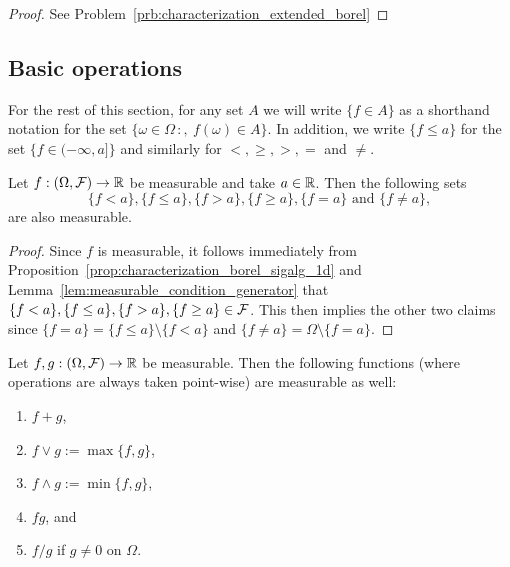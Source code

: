 \begin{proof}
See Problem~\ref{prb:characterization_extended_borel}
\end{proof}

\subsection{Basic operations}

For the rest of this section, for any set $A$ we will write $\{f \in A\}$ as a shorthand notation for the set $\{\omega \in \Omega \, :,\ f(\omega) \in A\}$. In addition, we write $\{f \le a\}$ for the set $\{f \in (-\infty, a]\}$ and similarly for $<, \ge, >, =$ and $\ne$.

\begin{lemma}\label{lem:measurable_set_real_line}
Let $f : (\Omega, \mathcal F) \to \mathbb R$ be measurable and take $a \in \mathbb R$. Then the following sets 
\[
	\{f < a\}, \{f \le a\}, \{f > a\}, \{f \ge a\}, \{f = a\} \text{ and } \{f \ne a\},
\]
are also measurable.
\end{lemma}

\begin{proof}
Since $f$ is measurable, it follows immediately from Proposition~\ref{prop:characterization_borel_sigalg_1d} and Lemma~\ref{lem:measurable_condition_generator} that $\{f < a\}, \{f \le a\},\{f > a\}, \{f \ge a\} \in \mathcal F$. This then implies the other two claims since $\{f = a\} = \{f \le a\} \setminus \{f < a\}$ and $\{f \ne a\} = \Omega \setminus \{f = a\}$.
\end{proof}

\begin{lemma}\label{lem:basic_properties_measurable_functions}
Let $f, g : (\Omega, \mathcal F) \to \mathbb R$ be measurable. Then the following functions (where operations are always taken point-wise) are measurable as well:
\begin{enumerate}[label=(\arabic*)]
\item $f + g$,
\item $f \vee g := \max\{f,g\}$,
\item $f \wedge g := \min\{f,g\}$,
\item $f g$, and
\item $f/g$ if $g \ne 0$ on $\Omega$.
\end{enumerate} 
\end{lemma}

